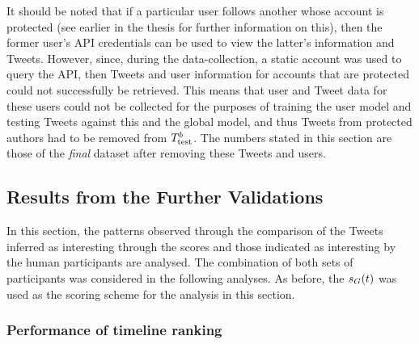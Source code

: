 It should be noted that if a particular user follows another whose account is protected (see earlier in the thesis for further information on this), then the former user's API credentials can be used to view the latter's information and Tweets. However, since, during the data-collection, a static account was used to query the API, then Tweets and user information for accounts that are protected could not successfully be retrieved. This means that user and Tweet data for these users could not be collected for the purposes of training the user model and testing Tweets against this and the global model, and thus Tweets from protected authors had to be removed from $T^b_{\textrm{test}}{}$. The numbers stated in this section are those of the \textit{final} dataset after removing these Tweets and users.


\subsection{Results from the Further Validations}
In this section, the patterns observed through the comparison of the Tweets inferred as interesting through the scores and those indicated as interesting by the human participants are analysed. The combination of both sets of participants was considered in the following analyses. As before, the $s_G(t)$ was used as the scoring scheme for the analysis in this section.

\subsubsection{Performance of timeline ranking}

